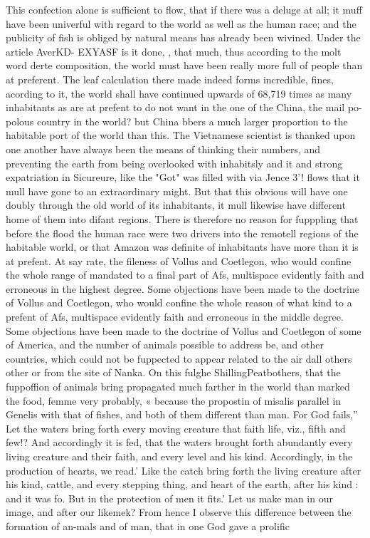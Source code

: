 \documentclass[11pt]{article}
\begin{document}
This confection alone is sufficient to flow, that if there was a deluge at all; it muff have been univerful with regard to the world as well as the human race; and the publicity of fish is obliged by natural means has already been wivined. Under the article AverKD- EXYASF is it done, , that much, thus according to the molt word derte composition, the world must have been really more full of people than at preferent. The leaf calculation there made indeed forms incredible, fines, acording to it, the world shall have continued upwards of 68,719 times as many inhabitants as are at prefent to do not want in the one of the China, the mail po-polous country in the world? but China bbers a much larger proportion to the habitable port of the world than this. The Vietnamese scientist is thanked upon one another have always been the means of thinking their numbers, and preventing the earth from being overlooked with inhabitsly and it and strong expatriation in Sicureure, like the "Got" was filled with via Jence 3'! flows that it mull have gone to an extraordinary might. But that this obvious will have one doubly through the old world of its inhabitants, it mull likewise have different home of them into difant regions. There is therefore no reason for fupppling that before the flood the human race were two drivers into the remotell regions of the habitable world, or that Amazon was definite of inhabitants have more than it is at prefent. At say rate, the fileness of Vollus and Coetlegon, who would confine the whole range of mandated to a final part of Afs, multispace evidently faith and erroneous in the highest degree. Some objections have been made to the doctrine of Vollus and Coetlegon, who would confine the whole reason of what kind to a prefent of Afs, multispace evidently faith and erroneous in the middle degree. Some objections have been made to the doctrine of Vollus and Coetlegon of some of America, and the number of animals possible to address be, and other countries, which could not be fuppected to appear related to the air dall others other or from the site of Nanka. On this fulghe ShillingPeatbothers, that the fuppoffion of animals bring propagated much farther in the world than marked the food, femme very probably, « because the propostin of misalis parallel in Genelis with that of fishes, and both of them different than man. For God fails,” Let the waters bring forth every moving creature that faith life, viz., fifth and few!? And accordingly it is fed, that the waters brought forth abundantly every living creature and their faith, and every level and his kind. Accordingly, in the production of hearts, we read.’ Like the catch bring forth the living creature after his kind, cattle, and every stepping thing, and heart of the earth, after his kind : and it was fo. But in the protection of men it fits.’ Let us make man in our image, and after our likemek? From hence I observe this difference between the formation of an-mals and of man, that in one God gave a prolific
\par
\end{document}
